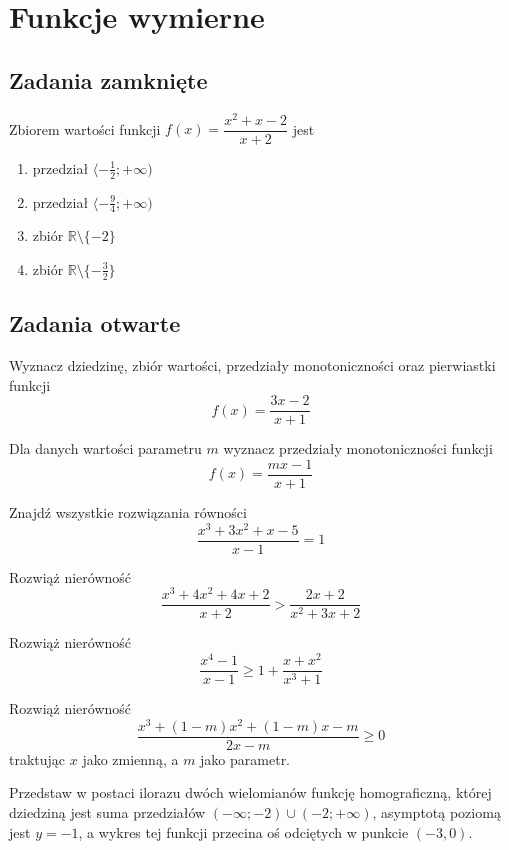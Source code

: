 \setcounter{parc}{0}
\addtocounter{chapc}{1}

\chapter{Funkcje wymierne}

\section{Zadania zamknięte}

\zadanie Zbiorem wartości funkcji $f(x) = \dfrac{x^2 + x - 2}{x + 2}$ jest
\begin{enumerate}[label=\alph*)]
	\item przedział $ \langle -\frac{1}{2}; +\infty ) $
	\item przedział $ \langle -\frac{9}{4}; +\infty ) $
	\item zbiór $\mathbb{R} \setminus \{-2\}$ %
	\item zbiór $\mathbb{R} \setminus \{-\frac{3}{2}\}$
\end{enumerate}

\section{Zadania otwarte}

\zadanie Wyznacz dziedzinę, zbiór wartości, przedziały monotoniczności oraz pierwiastki funkcji \[ f(x) = \dfrac{3x - 2}{x + 1} \]

\zadanie Dla danych wartości parametru $m$ wyznacz przedziały monotoniczności funkcji \[ f(x) = \dfrac{mx - 1}{x + 1} \]

\zadanie Znajdź wszystkie rozwiązania równości \[ \dfrac{x^3 + 3x^2 + x - 5}{x - 1} = 1 \] %

\zadanie Rozwiąż nierówność \[ \dfrac{x^3 + 4x^2 + 4x + 2}{x + 2} > \dfrac{2x + 2}{x^2 + 3x + 2}\] %

\zadanie Rozwiąż nierówność \[ \dfrac{x^4 - 1}{x - 1} \geqslant 1 + \dfrac{x + x^2}{x^3 + 1} \] %

\zadanie Rozwiąż nierówność \[  \dfrac{x^3 + (1 - m)x^2 + (1 - m)x - m}{2x - m} \geqslant 0 \] traktując $x$ jako zmienną, a $m$ jako parametr.

\zadanie Przedstaw w postaci ilorazu dwóch wielomianów funkcję homograficzną, której dziedziną jest suma przedziałów $(-\infty; -2) \cup (-2; +\infty)$, asymptotą poziomą jest $y = -1$, a wykres tej funkcji przecina oś odciętych w punkcie $(-3, 0)$.


